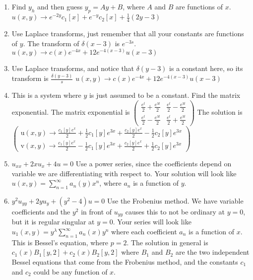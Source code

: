 {\begin{enumerate}
	\item 
	Find $y_h$ and then guess $y_p=Ay+B$, where $A$ and $B$ are functions of $x$. 
	$u(x,y)\to e^{-2 y} c_1[x]+e^{-y} c_2[x]+\frac{1}{4} (2 y-3)$
	
	\item 
	Use Laplace transforms, just remember that all your constants are functions of $y$. The transform of $\delta(x-3)$ is $e^{-3s}$.  
	$u(x,y)\to c(x)e^{-4x}+12 e^{-4(x-3)}u(x-3)$
	\item 
	Use Laplace transforms, and notice that $\delta(y-3)$ is a constant here, so its transform is $\frac{\delta(y-3)}{s}$
	$u(x,y)\to c(x)e^{-4x}+12 e^{-4(x-3)}u(x-3)$
	
	
	\item 
	This is a system where $y$ is just assumed to be a constant. Find the matrix exponential.	
	The matrix exponential is 
	$\left(
\begin{array}{cc}
 \frac{e^t}{2}+\frac{e^{3 t}}{2} & \frac{e^t}{2}-\frac{e^{3 t}}{2} \\
 \frac{e^t}{2}-\frac{e^{3 t}}{2} & \frac{e^t}{2}+\frac{e^{3 t}}{2}
\end{array}
\right)$
The solution is 
$\left(
\begin{array}{cc}
 \text{u}(x,y)\to \frac{c_1[y] e^x}{2}+\frac{1}{2} c_1[y] e^{3 x}+\frac{c_2[y]
   e^x}{2}-\frac{1}{2} c_2[y] e^{3 x} \\ \text{v}(x,y)\to \frac{c_1[y]
   e^x}{2}-\frac{1}{2} c_1[y] e^{3 x}+\frac{c_2[y] e^x}{2}+\frac{1}{2} c_2[y]
   e^{3 x}
\end{array}
\right)$
	\item 
	$u_{xx}+2x u_x + 4 u = 0$
	Use a power series, since the coefficients depend on variable we are differentiating with respect to.
	Your solution will look like $u(x,y)=\sum_{n=1}^\infty a_n(y)x^n$, where $a_n$ is a function of $y$.  
	
	\item 
	$y^2 u_{yy} + 2y u_y +(y^2-4) u = 0$
	Use the Frobenius method. We have variable coefficients and the $y^2$ in front of $u_{yy}$ causes this to not be ordinary at $y=0$, but it is regular singular at $y=0$.  Your series will look like $u_1(x,y) = y^\lambda \sum_{n=1}^\infty a_n(x) y^n$ where each coefficient $a_n$ is a function of $x$. This is Bessel's equation, where $p=2$.  The solution in general is $c_1(x)B_1[y,2]+c_2(x)B_2[y,2]$ where $B_1$ and $B_2$ are the two independent Bessel equations that come from the Frobenius method, and the constants $c_1$ and $c_2$ could be any function of $x$.   


\end{enumerate}}
